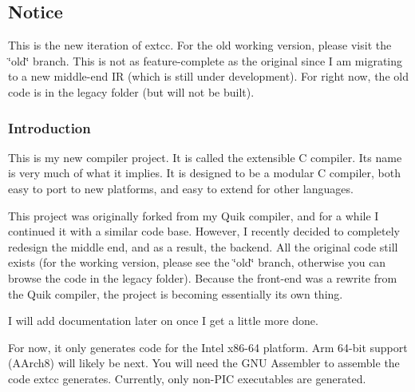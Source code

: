 \subsection*{Notice}

This is the new iteration of extcc. For the old working version, please visit the \char`\"{}old\char`\"{} branch. This is not as feature-\/complete as the original since I am migrating to a new middle-\/end IR (which is still under development). For right now, the old code is in the legacy folder (but will not be built).

\subsubsection*{Introduction}

This is my new compiler project. It is called the extensible C compiler. Its name is very much of what it implies. It is designed to be a modular C compiler, both easy to port to new platforms, and easy to extend for other languages.

This project was originally forked from my Quik compiler, and for a while I continued it with a similar code base. However, I recently decided to completely redesign the middle end, and as a result, the backend. All the original code still exists (for the working version, please see the \char`\"{}old\char`\"{} branch, otherwise you can browse the code in the legacy folder). Because the front-\/end was a rewrite from the Quik compiler, the project is becoming essentially its own thing.

I will add documentation later on once I get a little more done.

For now, it only generates code for the Intel x86-\/64 platform. Arm 64-\/bit support (A\+Arch8) will likely be next. You will need the G\+NU Assembler to assemble the code extcc generates. Currently, only non-\/\+P\+IC executables are generated. 